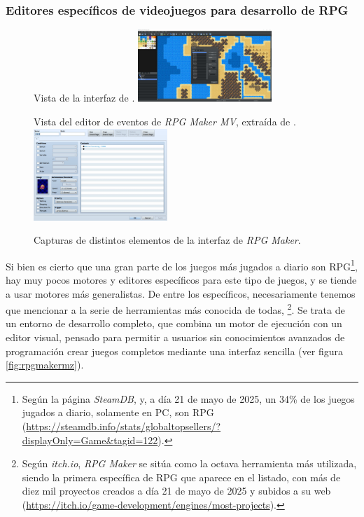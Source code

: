\subsubsection{Editores específicos de videojuegos para desarrollo de RPG}
\begin{figure}[h]
	\centering
	\begin{SubFloat}
		{\label{fig:rpgmakermz}%
		Vista de la interfaz de \cite{rpgmakermz}.}%
		\includegraphics[width=0.45\textwidth]{Imagenes/Vectorial/rpgmakermz}%
	\end{SubFloat}
	\qquad
	\begin{SubFloat}
		{\label{fig:rpgmakerevent}%
		Vista del editor de eventos de \textit{RPG Maker MV}, extraída de \cite{rpgmakerevent}.}%
		\includegraphics[width=0.45\textwidth]{Imagenes/Vectorial/rpgmakereventeditor}%
	\end{SubFloat}
	\caption{Capturas de distintos elementos de la interfaz de \textit{RPG Maker}. \label{fig:rpgmaker}}
\end{figure}

Si bien es cierto que una gran parte de los juegos más jugados a diario son RPG\footnote{Según la página \textit{SteamDB}, y, a día 21 de mayo de 2025, un 34\% de los juegos jugados a diario, solamente en PC, son RPG (\url{https://steamdb.info/stats/globaltopsellers/?displayOnly=Game&tagid=122}).}, hay muy pocos motores y editores específicos para este tipo de juegos, y se tiende a usar motores más generalistas. De entre los específicos, necesariamente tenemos que mencionar a la serie de herramientas más conocida de todas, \cite{rpgmaker}\footnote{Según \textit{itch.io}, \textit{RPG Maker} se sitúa como la octava herramienta más utilizada, siendo la primera específica de RPG que aparece en el listado, con más de diez mil proyectos creados a día 21 de mayo de 2025 y subidos a su web (\url{https://itch.io/game-development/engines/most-projects}).}. Se trata de un entorno de desarrollo completo, que combina un motor de ejecución con un editor visual, pensado para permitir a usuarios sin conocimientos avanzados de programación crear juegos completos mediante una interfaz sencilla (ver figura \ref{fig:rpgmakermz}).

